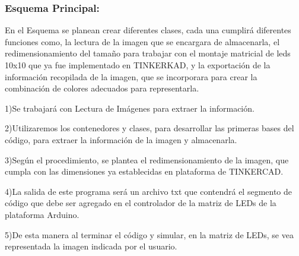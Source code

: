 \documentclass{article}
\begin{document}
\subsubsection{Esquema  Principal:}
En el Esquema se planean crear diferentes clases, cada una cumplirá diferentes funciones como, la lectura de la imagen que se encargara de almacenarla, el redimensionamiento del tamaño para trabajar con el montaje matricial de leds  10x10  que ya fue implementado en TINKERKAD, y la exportación de la información recopilada de la imagen, que  se incorporara para crear la combinación de colores adecuados para representarla.

1)Se trabajará con Lectura de Imágenes para extraer la información. 
\space{0.5cm}

2)Utilizaremos los contenedores y clases, para desarrollar las primeras bases del código, para extraer la información de la imagen  y almacenarla.
\vspace{0.5cm}

3)Según el procedimiento, se plantea el redimensionamiento de la imagen, que cumpla con las dimensiones ya establecidas en plataforma de TINKERCAD.
\vspace{0.5cm}

4)La salida de este programa será un archivo txt que contendrá el segmento de código que debe ser agregado en el controlador de la matriz de LEDs de la plataforma Arduino.

\vspace{0.5cm}
5)De esta manera al terminar el código y simular, en la matriz de LEDs, se vea representada la imagen indicada por el usuario.
\end{document}
